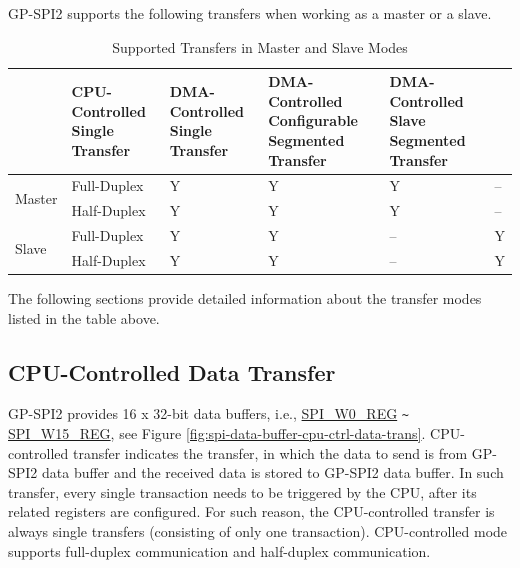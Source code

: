 \documentclass[main\_\_EN.tex]{subfiles}
\begin{document}
GP-SPI2 supports the following transfers when working as a master or a slave.

\begin{table}[H]
    \centering
    \caption{Supported Transfers in Master and Slave Modes}
    \label{tab:spi-transfers-master-slave}
    \begin{threeparttable}
    \begin{tabular}{|l|l|p{2.5cm}<{\centering}|p{2.5cm}<{\centering}|p{3.3cm}<{\centering}|p{3.3cm}<{\centering}| }
    \hline
        \rowcolor{lightgray}
        \multicolumn{2}{l|}{\textbf{Mode}}  & \textbf{CPU-Controlled Single Transfer}  & \textbf{DMA-Controlled Single Transfer} &   \textbf{DMA-Controlled Configurable Segmented Transfer}    & \textbf{DMA-Controlled Slave Segmented Transfer} \\\hline
    \multirow{2}{*}{Master} & Full-Duplex & Y & Y & Y & --\\\cline{2-6}

    & Half-Duplex & Y & Y & Y & --\\\hline

    \multirow{2}{*}{Slave} & Full-Duplex & Y & Y & -- &Y \\\cline{2-6}
    & Half-Duplex & Y & Y & -- &Y \\\hline
        \end{tabular}
     \end{threeparttable}
    \end{table}

The following sections provide detailed information about the transfer modes listed in the table above.

\subsection{CPU-Controlled Data Transfer}\label{sec:spi-func-descr-cpu-ctrl-data-trans}
GP-SPI2 provides 16 x 32-bit data buffers, i.e., \hyperref[regdesc:SPIW0REG]{SPI\_W0\_REG} \verb+~+ \hyperref[regdesc:SPIW15REG]{SPI\_W15\_REG}, see Figure \ref{fig:spi-data-buffer-cpu-ctrl-data-trans}.
CPU-controlled transfer indicates the transfer, in which the data to send is from GP-SPI2 data buffer and the received data is stored to GP-SPI2 data buffer.
In such transfer, every single transaction needs to be triggered by the CPU, after its related registers are configured. For such reason, the CPU-controlled transfer is always single transfers (consisting of only one transaction). CPU-controlled mode supports full-duplex communication and half-duplex communication.
\end{document}
